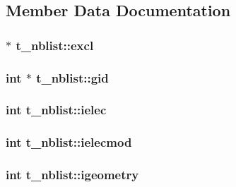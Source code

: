 \subsection{\-Member \-Data \-Documentation}
\hypertarget{structt__nblist_af8dcc14bbdd0124f2900b78a49e1dcf1}{
\subsubsection[{excl}]{ $\ast$ {\bf t\-\_\-nblist\-::excl}}}\label{structt__nblist_af8dcc14bbdd0124f2900b78a49e1dcf1}
\hypertarget{structt__nblist_aa7d07dc54b27e73925e1b2ad55d46192}{
\subsubsection[{gid}]{\setlength{\rightskip}{0pt plus 5cm}int $\ast$ {\bf t\-\_\-nblist\-::gid}}}\label{structt__nblist_aa7d07dc54b27e73925e1b2ad55d46192}
\hypertarget{structt__nblist_a09642fb6fa2ce6ec50d293eb988535c7}{
\subsubsection[{ielec}]{\setlength{\rightskip}{0pt plus 5cm}int {\bf t\-\_\-nblist\-::ielec}}}\label{structt__nblist_a09642fb6fa2ce6ec50d293eb988535c7}
\hypertarget{structt__nblist_ab9f87ac1139ac41775a5e9e25e23d1fc}{
\subsubsection[{ielecmod}]{\setlength{\rightskip}{0pt plus 5cm}int {\bf t\-\_\-nblist\-::ielecmod}}}\label{structt__nblist_ab9f87ac1139ac41775a5e9e25e23d1fc}
\hypertarget{structt__nblist_a372dc78e8e568f477eb57a1e81ec5bbb}{
\subsubsection[{igeometry}]{\setlength{\rightskip}{0pt plus 5cm}int {\bf t\-\_\-nblist\-::igeometry}}}\label{structt__nblist_a372dc78e8e568f477eb57a1e81ec5bbb}

